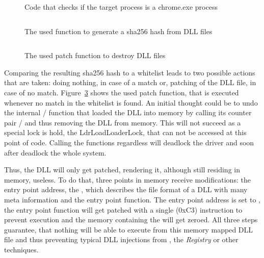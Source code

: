 \begin{figure}[h]
\inputminted[breakanywhere, breaklines,fontsize=\scriptsize, frame=single, mathescape, linenos, numbersep=5pt, numbersep=5pt, xleftmargin=0pt]{c}{sections/implementation/code4.c}
\caption{Code that checks if the target process is a chrome.exe process}
\label{code:code4}
\end{figure}
\begin{figure}[h]
\inputminted[breakanywhere, breaklines,fontsize=\scriptsize, frame=single, mathescape, linenos, numbersep=5pt, numbersep=5pt, xleftmargin=0pt]{c}{sections/implementation/code5.c}
\caption{The used function to generate a sha256 hash from \gls{DLL} files}
\label{code:code5}
\end{figure}
\begin{figure}[h]
\inputminted[breakanywhere, breaklines,fontsize=\scriptsize, frame=single, mathescape, linenos, numbersep=5pt, numbersep=5pt, xleftmargin=0pt]{c}{sections/implementation/code6.c}
\caption{The used patch function to destroy DLL files}
\label{code:code6}
\end{figure}
Comparing the resulting sha256 hash to a whitelist leads to two possible actions that are taken: doing nothing, in case of a match or, patching of the \gls{DLL} file, in case of no match. Figure~\ref{code:code6} shows the used patch function, that is executed whenever no match in the whitelist is found.
An initial thought could be to undo the internal / function that loaded the \gls{DLL} into memory by calling its counter pair / and thus removing the \gls{DLL} from memory. This will not succeed as a special lock is hold, the LdrLoadLoaderLock, that can not be accessed at this point of code. Calling the functions regardless will deadlock the driver and soon after deadlock the whole system. 

\medskip

Thus, the \gls{DLL} will only get patched, rendering it, although still residing in memory, useless. To do that, three points in memory receive modifications: the entry point address, the , which describes the file format of a \gls{DLL} with many meta information and the entry point function. The entry point address is set to , the entry point function will get patched with a single  (0xC3) instruction to prevent execution and the memory containing the  will get zeroed. All three steps guarantee, that nothing will be able to execute from this memory mapped \gls{DLL} file and thus preventing typical \gls{DLL} injections from , the \emph{Registry} or other techniques.

